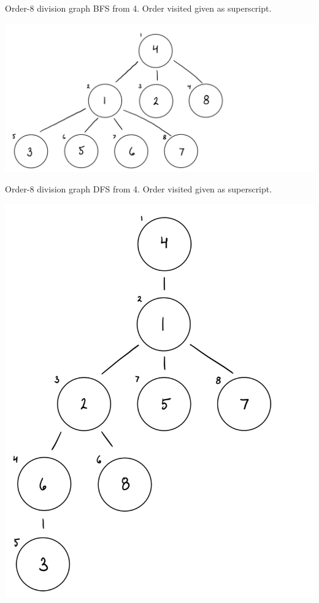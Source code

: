 \documentclass[12pt,twoside]{article}
\begin{document}
\begin{problems}
\begin{problemparts}
\problempart Order-8 division graph BFS from 4. Order visited given as
superscript.
    \begin{center}
        \includegraphics[scale=0.35]{Images/P1Ci.PNG}
    \end{center}

    Order-8 division graph DFS from 4. Order visited given as superscript.
    \begin{center}
        \includegraphics[scale=0.35]{Images/P1Cii.PNG}
    \end{center}


\end{problemparts}
\end{problems}
\end{document}
